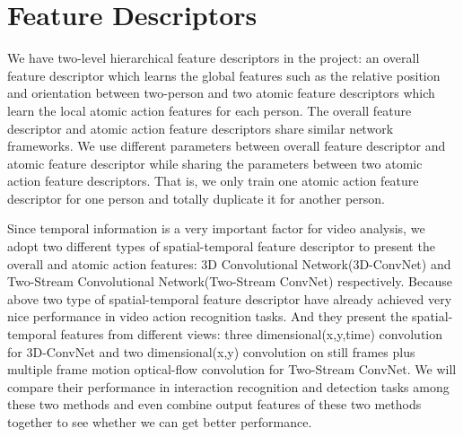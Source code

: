 \section{Feature Descriptors}
\label{3_3}
We have two-level hierarchical feature descriptors in the project: an overall feature descriptor which learns the global features such as the relative position and orientation between two-person and two atomic feature descriptors which learn the local atomic action features for each person. The overall feature descriptor and atomic action feature descriptors share similar network frameworks. We use different parameters between overall feature descriptor and atomic feature descriptor while sharing the parameters between two atomic action feature descriptors. That is, we only train one atomic action feature descriptor for one person and totally duplicate it for another person.  
\par 
Since temporal information is a very important factor for video analysis, we adopt two different types of spatial-temporal feature descriptor to present the overall and atomic action features: 3D Convolutional Network(3D-ConvNet)\cite{Tran2015} and Two-Stream Convolutional Network(Two-Stream ConvNet) \cite{simonyan2014} respectively. Because above two type of spatial-temporal feature descriptor have already achieved very nice performance in video action recognition tasks. And they present the spatial-temporal features from different views: three dimensional(x,y,time) convolution for 3D-ConvNet and two dimensional(x,y) convolution on still frames plus multiple frame motion optical-flow convolution for Two-Stream ConvNet. We will compare their performance in interaction recognition and detection tasks among these two methods and even combine output features of these two methods together to see whether we can get better performance. 
 
